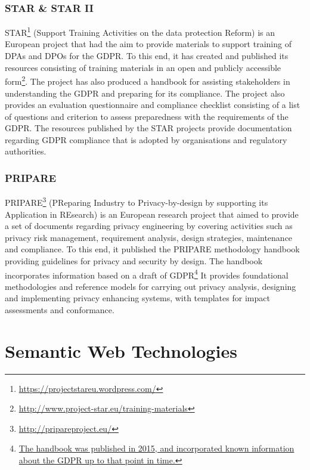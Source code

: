 \subsubsection{STAR \& STAR II}
STAR\footnote{\url{https://projectstareu.wordpress.com/}} (Support Training Activities on the data protection Reform) is an European project that had the aim to provide materials to support training of DPAs and DPOs for the GDPR. To this end, it has created and published its resources consisting of training materials in an open and publicly accessible form\footnote{\url{http://www.project-star.eu/training-materials}}. The project has also produced a handbook for assisting stakeholders in understanding the GDPR and preparing for its compliance. The project also provides an evaluation questionnaire and compliance checklist \cite{GDPR_compliance_checklist_STAR}consisting of a list of questions and criterion to assess preparedness with the requirements of the GDPR. 
The resources published by the STAR projects provide documentation regarding GDPR compliance that is adopted by organisations and regulatory authorities.

\subsubsection{PRIPARE}
PRIPARE\footnote{\url{http://pripareproject.eu/}} (PReparing Industry to Privacy-by-design by supporting its Application in REsearch) is an European research project that aimed to provide a set of documents regarding privacy engineering by covering activities such as privacy risk management, requirement analysis, design strategies, maintenance and compliance. To this end, it published the PRIPARE methodology handbook \cite{noauthor_privacy_2015} providing guidelines for privacy and security by design. The handbook incorporates information based on a draft of GDPR\footnote{\url{The handbook was published in 2015, and incorporated known information about the GDPR up to that point in time.}} It provides foundational methodologies and reference models for carrying out privacy analysis, designing and implementing privacy enhancing systems, with templates for impact assessments and conformance. 

\section{Semantic Web Technologies}\label{sec:background:semweb}

